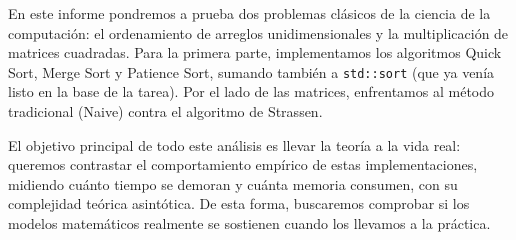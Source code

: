 En este informe pondremos a prueba dos problemas clásicos de la ciencia de la computación: el ordenamiento de arreglos unidimensionales y la multiplicación de matrices cuadradas. Para la primera parte, implementamos los algoritmos Quick Sort, Merge Sort y Patience Sort, sumando también a \texttt{std::sort} (que ya venía listo en la base de la tarea). Por el lado de las matrices, enfrentamos al método tradicional (Naive) contra el algoritmo de Strassen. 

El objetivo principal de todo este análisis es llevar la teoría a la vida real: queremos contrastar el comportamiento empírico de estas implementaciones, midiendo cuánto tiempo se demoran y cuánta memoria consumen, con su complejidad teórica asintótica. De esta forma, buscaremos comprobar si los modelos matemáticos realmente se sostienen cuando los llevamos a la práctica.